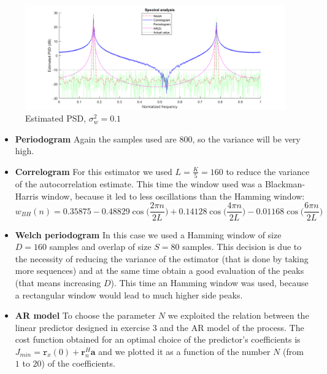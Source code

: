 \documentclass[a4paper, 12pt]{report}
\begin{document}
\begin{figure}[H]
	\centering
	\includegraphics[width=1\textwidth]{estimatedpsd01}
	\caption{Estimated PSD, $\sigma_w^2 = 0.1$}
	\label{fig:estimatedpsd01}
\end{figure}


\begin{itemize}
	
	\item {\bf Periodogram} Again the samples used are 800, so the variance will be very high.
	
	\item {\bf Correlogram}  For this estimator we used $L=\frac{K}{5}=160$ to reduce the variance of the autocorrelation estimate. This time the window used was a Blackman-Harris window, because it led to less oscillations than the Hamming window:
	\begin{equation}
	w_{BH}(n)=0.35875-0.48829\cos \Big( \frac{2\pi n}{2L} \Big) +0.14128\cos \Big( \frac{4\pi n}{2L} \Big) - 0.01168 \cos \Big( \frac{6 \pi n}{2L} \Big)
	\end{equation}
	
	\item {\bf Welch periodogram} In this case we used a Hamming window of size $D=160$ samples and overlap of size $S=80$ samples. This decision is due to the necessity of reducing the variance of the estimator (that is done by taking more sequences) and at the same time obtain a good evaluation of the peaks (that means increasing $D$). This time an Hamming window was used, because a rectangular window would lead to much higher side peaks. 
	
	
\item {\bf AR model} To choose the parameter $N$ we exploited the relation between the linear predictor designed in exercise 3 and the AR model of the process.  The cost function obtained for an optimal choice of the predictor's coefficients is  $J_{min} = \mathtt{r}_x(0) + \mathbf{r}_n^H \mathbf{a}$ and we plotted it as a function of the number $N$ (from $1$ to $20$) of the coefficients.


\end{itemize}
\end{document}

